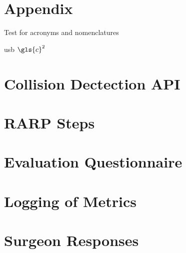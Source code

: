 
\appendix%

\chapter{Appendix}
Test for acronyms and nomenclatures

\gls{usb} $\gls{c}^2$

\chapter{Collision Dectection API}\label{apn:collision_detection_api}

\chapter{RARP Steps}\label{apn:rarp_steps}

\chapter{Evaluation Questionnaire}\label{apn:evaluation_questionnaire}


\chapter{Logging of Metrics}\label{apn:logging_metrics}


\chapter{Surgeon Responses}\label{apn:surgeon_responses}


%
%

